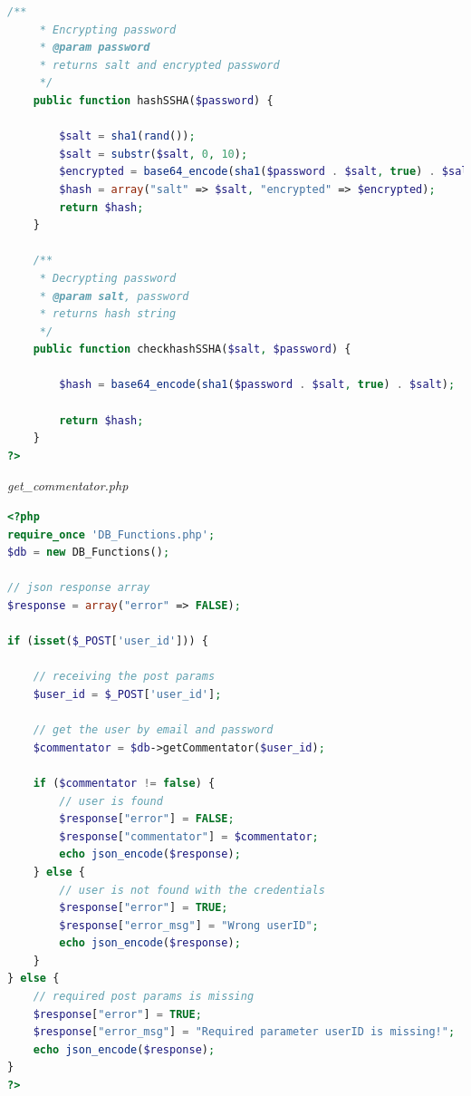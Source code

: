 \documentclass{article}
\begin{document}
\begin{landscape}
\begin{lstlisting}[language=php,basicstyle=\tiny,showstringspaces=false]
    /**
     * Encrypting password
     * @param password
     * returns salt and encrypted password
     */
    public function hashSSHA($password) {
 
        $salt = sha1(rand());
        $salt = substr($salt, 0, 10);
        $encrypted = base64_encode(sha1($password . $salt, true) . $salt);
        $hash = array("salt" => $salt, "encrypted" => $encrypted);
        return $hash;
    }
 
    /**
     * Decrypting password
     * @param salt, password
     * returns hash string
     */
    public function checkhashSSHA($salt, $password) {
 
        $hash = base64_encode(sha1($password . $salt, true) . $salt);
 
        return $hash;
    }
?>
\end{lstlisting}
{\large \textit{get\_commentator.php}}
\begin{lstlisting}[language=PHP,basicstyle=\tiny,showstringspaces=false]
<?php
require_once 'DB_Functions.php';
$db = new DB_Functions();
 
// json response array
$response = array("error" => FALSE);
 
if (isset($_POST['user_id'])) {
 
    // receiving the post params
    $user_id = $_POST['user_id'];
 
    // get the user by email and password
    $commentator = $db->getCommentator($user_id);
 
    if ($commentator != false) {
        // user is found
        $response["error"] = FALSE;
        $response["commentator"] = $commentator;
        echo json_encode($response);
    } else {
        // user is not found with the credentials
        $response["error"] = TRUE;
        $response["error_msg"] = "Wrong userID";
        echo json_encode($response);
    }
} else {
    // required post params is missing
    $response["error"] = TRUE;
    $response["error_msg"] = "Required parameter userID is missing!";
    echo json_encode($response);
}
?>
\end{lstlisting}
\end{landscape}
\end{document}
